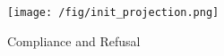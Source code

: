 
\begin{figure}[H]
    \centering
    \texttt{[image: /fig/init\_projection.png]}
    \caption{Compliance and Refusal}
    \label{fig:enter-label}
\end{figure}